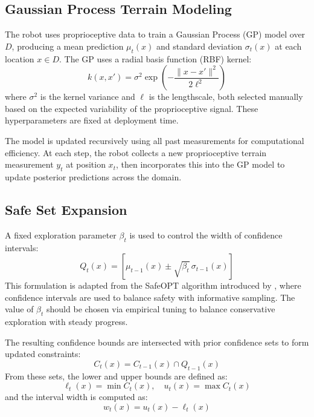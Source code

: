 \subsection{Gaussian Process Terrain Modeling}

The robot uses proprioceptive data to train a Gaussian Process (GP) model over \( D \), producing a mean prediction \( \mu_t(x) \) and standard deviation \( \sigma_t(x) \) at each location \( x \in D \). The GP uses a radial basis function (RBF) kernel:
\[
k(x, x') = \sigma^2 \exp\left(-\frac{\|x - x'\|^2}{2 \ell^2}\right)
\]
where \( \sigma^2 \) is the kernel variance and \( \ell \) is the lengthscale, both selected manually based on the expected variability of the proprioceptive signal. These hyperparameters are fixed at deployment time.

The model is updated recursively using all past measurements for computational efficiency. At each step, the robot collects a new proprioceptive terrain measurement \( y_t \) at position \( x_t \), then incorporates this into the GP model to update posterior predictions across the domain.

\subsection{Safe Set Expansion}

A fixed exploration parameter \( \beta_t \) is used to control the width of confidence intervals:
\begin{equation}
Q_t(x) = \left[\mu_{t-1}(x) \pm \sqrt{\beta_t}\, \sigma_{t-1}(x)\right]
\end{equation}
This formulation is adapted from the SafeOPT algorithm introduced by \textcite{safeopt}, where confidence intervals are used to balance safety with informative sampling. The value of \( \beta_t \) should be chosen via empirical tuning to balance conservative exploration with steady progress.

The resulting confidence bounds are intersected with prior confidence sets to form updated constraints:
\begin{equation}
    C_t(x) = C_{t-1}(x) \cap Q_{t-1}(x)
\end{equation}
From these sets, the lower and upper bounds are defined as:
\begin{equation}
    \ell_t(x) = \min C_t(x), \quad u_t(x) = \max C_t(x)
\end{equation}
and the interval width is computed as:
\begin{equation}
    w_t(x) = u_t(x) - \ell_t(x)
\end{equation}


